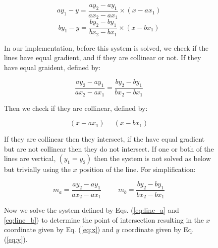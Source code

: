 \documentclass[11pt,landscape]{article}
\begin{document}
\begin{multicols}{3}
\begin{figure}[H]
    \begin{mdframed}
        \begin{center}
            \begin{equation}
                ay_1-y = \frac{ay_2 - ay_1}{ax_2 - ax_1} \times (x - ax_1)
                \label{eq:line_a}
            \end{equation}
            \begin{equation}
                by_1-y = \frac{by_2 - by_1}{bx_2 - bx_1} \times (x - bx_1)
                \label{eq:line_b}
            \end{equation}
        \end{center}
    In our implementation, before this system is solved, we check if the lines
    have equal gradient, and if they are collinear or not. If they have equal
    graident, defined by:
    \begin{center}
        \begin{equation*}
            \frac{ay_2 - ay_1}{ax_2 - ax_1} = \frac{by_2 - by_1}{bx_2 - bx_1}
        \end{equation*}
    \end{center}
    Then we check if they are collinear, defined by:
    \begin{center}
        \begin{equation*}
            (x - ax_1) = (x - bx_1)
        \end{equation*}
    \end{center}
    If they are collinear then they intersect, if the have equal gradient but
    are not collinear then they do not intersect. If one or both of the lines
    are vertical, $(y_1 = y_2)$ then the system is not solved as below but
    trivially using the $x$ position of the line.\vspace{0.5cm}
    \newline
    For simplification:
    \begin{center}
        \begin{equation*}
            m_a = \frac{ay_2 - ay_1}{ax_2 - ax_1} \hspace{1cm} m_b = \frac{by_2 - by_1}{bx_2 - bx_1}
        \end{equation*}
    \end{center}
    Now we solve the system defined by Eqs. (\ref{eq:line_a} and
    \ref{eq:line_b}) to determine the point of intersection resulting in the $x$
    coordinate given by Eq. (\ref{eq:x}) and $y$ coordinate given by Eq.
    (\ref{eq:y}).

\end{mdframed}
\end{figure}
\end{multicols}
\end{document}

